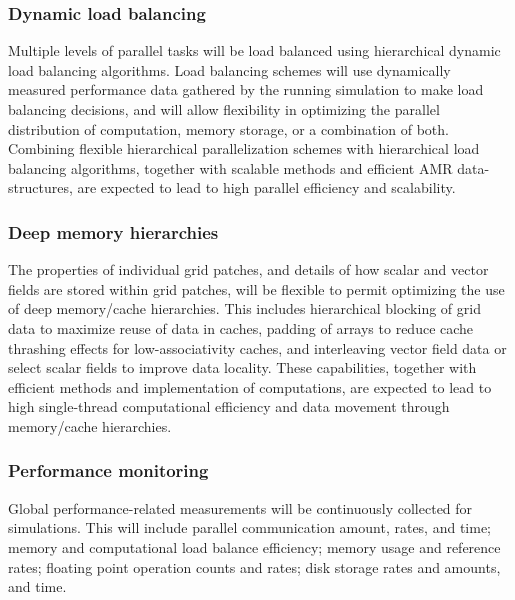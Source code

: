 \documentclass[11pt]{article}
\begin{document}

    \subsubsection{Dynamic load balancing}  

    Multiple levels of parallel tasks will be load balanced using
    hierarchical dynamic load balancing algorithms.  Load balancing
    schemes will use dynamically measured performance data gathered by
    the running simulation to make load balancing decisions, and will
    allow flexibility in optimizing the parallel distribution of
    computation, memory storage, or a combination of both.  Combining
    flexible hierarchical parallelization schemes with hierarchical
    load balancing algorithms, together with scalable methods and
    efficient AMR data-structures, are expected to lead to high
    parallel efficiency and scalability.


    \subsubsection{Deep memory hierarchies}  
%
    The properties of individual grid patches, and details of how
    scalar and vector fields are stored within grid patches, will be
    flexible to permit optimizing the use of deep memory/cache
    hierarchies.  This includes hierarchical blocking of grid data to
    maximize reuse of data in caches, padding of arrays to reduce
    cache thrashing effects for low-associativity caches, and
    interleaving vector field data or select scalar fields to improve
    data locality.  These capabilities, together with efficient
    methods and implementation of computations, are expected to lead
    to high single-thread computational efficiency and data movement
    through memory/cache hierarchies.


    \subsubsection{Performance monitoring}  
%
    Global performance-related measurements will be continuously
    collected for simulations.  This will include parallel
    communication amount, rates, and time; memory and computational
    load balance efficiency; memory usage and reference rates;
    floating point operation counts and rates; disk storage rates and
    amounts, and time.
\end{document}
